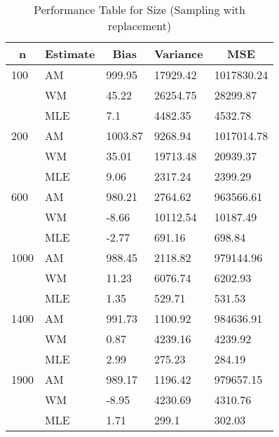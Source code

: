 \begin{table}[!tbp]
\caption{Performance Table for Size (Sampling with replacement)\label{t_size_infin}} 
\begin{center}
\begin{tabular}{lllll}
\hline\hline
\multicolumn{1}{c}{n}&\multicolumn{1}{c}{Estimate}&\multicolumn{1}{c}{Bias}&\multicolumn{1}{c}{Variance}&\multicolumn{1}{c}{MSE}\tabularnewline
\hline
100&AM&999.95&17929.42&1017830.24\tabularnewline
&WM&45.22&26254.75&28299.87\tabularnewline
&MLE&7.1&4482.35&4532.78\tabularnewline
200&AM&1003.87&9268.94&1017014.78\tabularnewline
&WM&35.01&19713.48&20939.37\tabularnewline
&MLE&9.06&2317.24&2399.29\tabularnewline
600&AM&980.21&2764.62&963566.61\tabularnewline
&WM&-8.66&10112.54&10187.49\tabularnewline
&MLE&-2.77&691.16&698.84\tabularnewline
1000&AM&988.45&2118.82&979144.96\tabularnewline
&WM&11.23&6076.74&6202.93\tabularnewline
&MLE&1.35&529.71&531.53\tabularnewline
1400&AM&991.73&1100.92&984636.91\tabularnewline
&WM&0.87&4239.16&4239.92\tabularnewline
&MLE&2.99&275.23&284.19\tabularnewline
1900&AM&989.17&1196.42&979657.15\tabularnewline
&WM&-8.95&4230.69&4310.76\tabularnewline
&MLE&1.71&299.1&302.03\tabularnewline
\hline
\end{tabular}\end{center}

\end{table}
